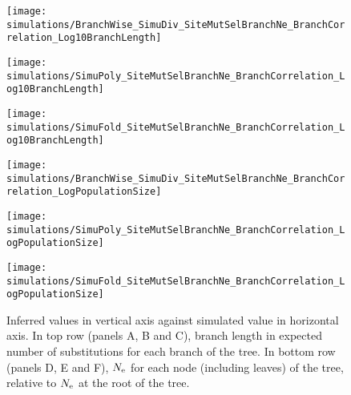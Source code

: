 \begin{figure}[htbp]
    \centering
    \begin{minipage}{0.32\linewidth}
        \texttt{[image: simulations/BranchWise\_SimuDiv\_SiteMutSelBranchNe\_BranchCorrelation\_Log10BranchLength]}
    \end{minipage}
    \hfill
    \begin{minipage}{0.32\linewidth}
        \texttt{[image: simulations/SimuPoly\_SiteMutSelBranchNe\_BranchCorrelation\_Log10BranchLength]}
    \end{minipage}
    \hfill
    \begin{minipage}{0.32\linewidth}
        \texttt{[image: simulations/SimuFold\_SiteMutSelBranchNe\_BranchCorrelation\_Log10BranchLength]}
    \end{minipage}
    \hfill
    \begin{minipage}{0.32\linewidth}
        \texttt{[image: simulations/BranchWise\_SimuDiv\_SiteMutSelBranchNe\_BranchCorrelation\_LogPopulationSize]}
    \end{minipage}
    \hfill
    \begin{minipage}{0.32\linewidth}
        \texttt{[image: simulations/SimuPoly\_SiteMutSelBranchNe\_BranchCorrelation\_LogPopulationSize]}
    \end{minipage}
    \hfill
    \begin{minipage}{0.32\linewidth}
        \texttt{[image: simulations/SimuFold\_SiteMutSelBranchNe\_BranchCorrelation\_LogPopulationSize]}
    \end{minipage}
    \hfill
    \caption[Inferred and simulated branch length and $\Ne$]{
    Inferred values in vertical axis against simulated value in horizontal axis.
    In top row (panels A, B and C), branch length in expected number of \glspl{substitution} for each branch of the tree.
    In bottom row (panels D, E and F), $\Ne$ for each node (including leaves) of the tree, relative to $\Ne$ at the root of the tree.
}
\end{figure}
